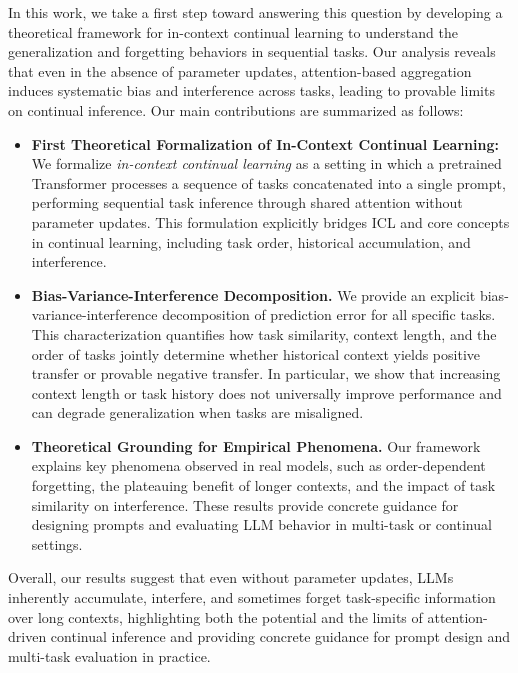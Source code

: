 \documentclass{article}
\theoremstyle{plain}
\theoremstyle{definition}
\theoremstyle{remark}
\begin{document}
In this work, we take a first step toward answering this question by developing a theoretical framework for in-context continual learning to understand the generalization and forgetting behaviors in sequential tasks. Our analysis reveals that even in the absence of parameter updates, attention-based aggregation induces systematic bias and interference across tasks, leading to provable limits on continual inference. Our main contributions are summarized as follows:
\begin{itemize}
    \item \textbf{First Theoretical Formalization of In-Context Continual Learning:} We formalize \emph{in-context continual learning} as a setting in which a pretrained Transformer processes a sequence of tasks concatenated into a single prompt, performing sequential task inference through shared attention without parameter updates. This formulation explicitly bridges ICL and core concepts in continual learning, including task order, historical accumulation, and interference.
    \item \textbf{Bias-Variance-Interference Decomposition.} We provide an explicit bias-variance-interference decomposition of prediction error for all specific tasks. This characterization quantifies how task similarity, context length, and the order of tasks jointly determine whether historical context yields positive transfer or provable negative transfer. In particular, we show that increasing context length or task history does not universally improve performance and can degrade generalization when tasks are misaligned.
    \item \textbf{Theoretical Grounding for Empirical Phenomena.} Our framework explains key phenomena observed in real models, such as order-dependent forgetting, the plateauing benefit of longer contexts, and the impact of task similarity on interference. These results provide concrete guidance for designing prompts and evaluating LLM behavior in multi-task or continual settings.
\end{itemize}

Overall, our results suggest that even without parameter updates, LLMs inherently accumulate, interfere, and sometimes forget task-specific information over long contexts, highlighting both the potential and the limits of attention-driven continual inference and providing concrete guidance for prompt design and multi-task evaluation in practice.
\end{document}
